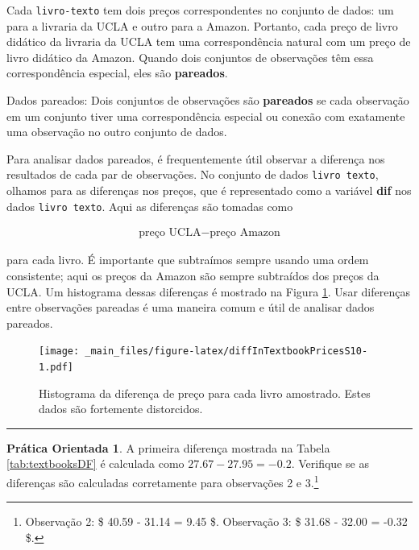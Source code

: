 \documentclass[
]{book}
\theoremstyle{definition}
\theoremstyle{definition}
\theoremstyle{definition}
\newtheorem{exercise}{Prática Orientada}[chapter]
\theoremstyle{definition}
\theoremstyle{remark}
\begin{document}
Cada \texttt{livro-texto} tem dois preços correspondentes no conjunto de dados: um para a livraria da UCLA e outro para a Amazon. Portanto, cada preço de livro didático da livraria da UCLA tem uma correspondência natural com um preço de livro didático da Amazon. Quando dois conjuntos de observações têm essa correspondência especial, eles são \textbf{pareados}.

Dados pareados: Dois conjuntos de observações são \textbf{pareados} se cada observação em um conjunto tiver uma correspondência especial ou conexão com exatamente uma observação no outro conjunto de dados.

Para analisar dados pareados, é frequentemente útil observar a diferença nos resultados de cada par de observações. No conjunto de dados \texttt{livro\ texto}, olhamos para as diferenças nos preços, que é representado como a variável \textbf{dif} nos dados \texttt{livro\ texto}. Aqui as diferenças são tomadas como

\begin{eqnarray*}
\text{preço UCLA} - \text{preço Amazon}
\end{eqnarray*}

para cada livro. É importante que subtraímos sempre usando uma ordem consistente; aqui os preços da Amazon são sempre subtraídos dos preços da UCLA. Um histograma dessas diferenças é mostrado na Figura \ref{fig:diffInTextbookPricesS10}. Usar diferenças entre observações pareadas é uma maneira comum e útil de analisar dados pareados.

\begin{figure}
\centering
\texttt{[image: \_main\_files/figure-latex/diffInTextbookPricesS10-1.pdf]}
\caption{\label{fig:diffInTextbookPricesS10}Histograma da diferença de preço para cada livro amostrado. Estes dados são fortemente distorcidos.}
\end{figure}

\begin{center}\rule{0.5\linewidth}{0.5pt}\end{center}

\begin{exercise}
\protect\hypertarget{exr:unnamed-chunk-197}{}{\label{exr:unnamed-chunk-197} }A primeira diferença mostrada na Tabela \ref{tab:textbooksDF} é calculada como \(27.67-27.95 = -0.2\). Verifique se as diferenças são calculadas corretamente para observações 2 e 3.\footnote{Observação 2: \$ 40.59 - 31.14 = 9.45 \$. Observação 3: \$ 31.68 - 32.00 = -0.32 \$.}
\end{exercise}
\end{document}
